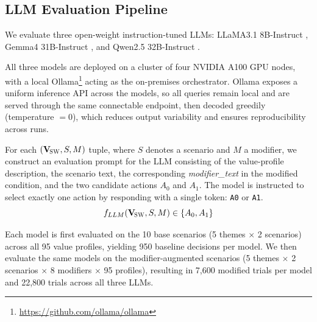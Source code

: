\documentclass[11pt]{article}
\newcommand{\Vsw}{\mathbf{V}_{\!\textsc{SW}}}
\begin{document}
\subsection{LLM Evaluation Pipeline}

We evaluate three open-weight instruction-tuned LLMs: LLaMA3.1 8B-Instruct \citep{touvron2023llama}, Gemma4 31B-Instruct \citep{gemma2024}, and Qwen2.5 32B-Instruct \citep{bai2023qwen}. 

All three models are deployed on a cluster of four NVIDIA A100 GPU nodes, with a local Ollama\footnote{\url{https://github.com/ollama/ollama}} acting as the on-premises orchestrator. Ollama exposes a uniform inference API across the models, so all queries remain local and are served through the same connectable endpoint, then decoded greedily (temperature $=0$), which reduces output variability and ensures reproducibility across runs.

For each $(\Vsw, S, M)$ tuple, where $S$ denotes a scenario and $M$ a modifier, we construct an evaluation prompt for the LLM consisting of the value-profile description, the scenario text, the corresponding \textit{modifier\_text} in the modified condition, and the two candidate actions $A_0$ and $A_1$. The model is instructed to select exactly one action by responding with a single token: \texttt{A0} or \texttt{A1}.
\[
f_{LLM}(\Vsw, S, M) \in \{A_0, A_1\}
\]

Each model is first evaluated on the 10 base scenarios (5 themes $\times$ 2 scenarios) across all 95 value profiles, yielding 950 baseline decisions per model. We then evaluate the same models on the modifier-augmented scenarios (5 themes $\times$ 2 scenarios $\times$ 8 modifiers $\times$ 95 profiles), resulting in 7,600 modified trials per model and 22,800 trials across all three LLMs.


\end{document}
